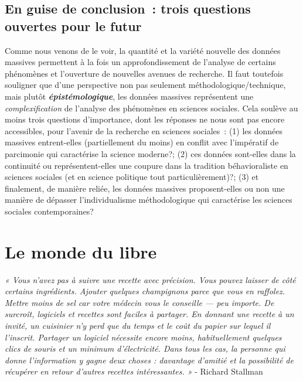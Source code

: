 \documentclass[
  letterpaper,
]{scrbook}
\begin{document}
\hypertarget{en-guise-de-conclusion-trois-questions-ouvertes-pour-le-futur}{%
\section{En guise de conclusion~: trois questions ouvertes pour le
futur}\label{en-guise-de-conclusion-trois-questions-ouvertes-pour-le-futur}}

Comme nous venons de le voir, la quantité et la variété nouvelle des
données massives permettent à la fois un approfondissement de l'analyse
de certains phénomènes et l'ouverture de nouvelles avenues de recherche.
Il faut toutefois souligner que d'une perspective non pas seulement
méthodologique/technique, mais plutôt \textbf{\emph{épistémologique}},
les données massives représentent une \emph{complexification} de
l'analyse des phénomènes en sciences sociales. Cela soulève au moins
trois questions d'importance, dont les réponses ne nous sont pas encore
accessibles, pour l'avenir de la recherche en sciences sociales~: (1)
les données massives entrent-elles (partiellement du moins) en conflit
avec l'impératif de parcimonie qui caractérise la science moderne?; (2)
ces données sont-elles dans la continuité ou représentent-elles une
coupure dans la tradition béhavioraliste en sciences sociales (et en
science politique tout particulièrement)?; (3) et finalement, de manière
reliée, les données massives proposent-elles ou non une manière de
dépasser l'individualisme méthodologique qui caractérise les sciences
sociales contemporaines?


\hypertarget{le-monde-du-libre}{%
\chapter{Le monde du libre}\label{le-monde-du-libre}}

\emph{« Vous n'avez pas à suivre une recette avec précision. Vous pouvez
laisser de côté certains ingrédients. Ajouter quelques champignons parce
que vous en raffolez. Mettre moins de sel car votre médecin vous le
conseille --- peu importe. De surcroît, logiciels et recettes sont
faciles à partager. En donnant une recette à un invité, un cuisinier n'y
perd que du temps et le coût du papier sur lequel il l'inscrit. Partager
un logiciel nécessite encore moins, habituellement quelques clics de
souris et un minimum d'électricité. Dans tous les cas, la personne qui
donne l'information y gagne deux choses : davantage d'amitié et la
possibilité de récupérer en retour d'autres recettes intéressantes. »} -
Richard Stallman
\end{document}
